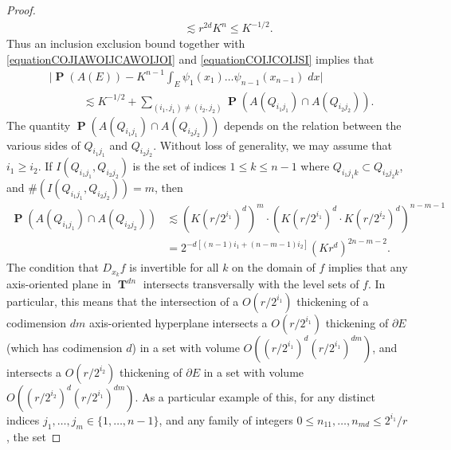 \documentclass[dvipsnames,letterpaper,12pt]{article}
\numberwithin{equation}{section}
\DeclareMathOperator{\TT}{\mathbf{T}}
\numberwithin{theorem}{section}
\DeclareMathOperator{\PP}{\mathbf{P}}
\begin{document}
\begin{proof}
\begin{equation}
\begin{split}
        &\quad\quad\quad\lesssim r^{2d} K^n \leq K^{-1/2}.
    \end{split}
    \end{equation}
    Thus an inclusion exclusion bound together with \eqref{equationCOJIAWOIJCAWOIJOI} and \eqref{equationCOIJCOIJSI} implies that
    \begin{equation} \label{equationvVIDJDIJ21312ffijsijds}
    \begin{split}
        &\Big| \PP(A(E)) - K^{n-1} \int_E \psi_1(x_1) \dots \psi_{n-1}(x_{n-1})\; dx \Big|\\
        &\quad\quad\quad \lesssim K^{-1/2} + \sum_{(i_1,j_1) \neq (i_2,j_2)} \PP(A(Q_{i_1j_1}) \cap A(Q_{i_2j_2})).
    \end{split}
    \end{equation}
    The quantity $\PP(A(Q_{i_1j_1}) \cap A(Q_{i_2j_2}))$ depends on the relation between the various sides of $Q_{i_1j_1}$ and $Q_{i_2j_2}$. Without loss of generality, we may assume that $i_1 \geq i_2$. If $I(Q_{i_1j_1},Q_{i_2j_2})$ is the set of indices $1 \leq k \leq n-1$ where $Q_{i_1j_1k} \subset Q_{i_2j_2k}$, and $\#(I(Q_{i_1j_1}, Q_{i_2j_2})) = m$, then
    \begin{equation} \label{equationVOIJVIJISJCISJCIEWJRIJI43234}
    \begin{split}
        \PP(A(Q_{i_1j_1}) \cap A(Q_{i_2j_2})) &\lesssim (K(r/2^{i_1})^d)^m \cdot (K(r/2^{i_1})^d \cdot K(r/2^{i_2})^d)^{n-m-1}\\
        &= 2^{-d[(n-1)i_1 + (n-m-1)i_2]} (Kr^d)^{2n - m-2}.
    \end{split}
    \end{equation}
    The condition that $D_{x_k} f$ is invertible for all $k$ on the domain of $f$ implies that any axis-oriented plane in $\TT^{dn}$ intersects transversally with the level sets of $f$. In particular, this means that the intersection of a $O(r/2^{i_1})$ thickening of a codimension $dm$ axis-oriented hyperplane intersects a $O(r/2^{i_1})$ thickening of $\partial E$ (which has codimension $d$) in a set with volume $O \left( (r/2^{i_1})^d (r/2^{i_1})^{dm} \right)$, and intersects a $O(r/2^{i_2})$ thickening of $\partial E$ in a set with volume $O \left( (r/2^{i_2})^d (r/2^{i_1})^{dm} \right)$. As a particular example of this, for any distinct indices $j_1,\dots,j_m \in \{ 1,\dots, n-1 \}$, and any family of integers $0 \leq n_{11},\dots,n_{md} \leq 2^{i_1}/r$, the set

\end{proof}
\end{document}
